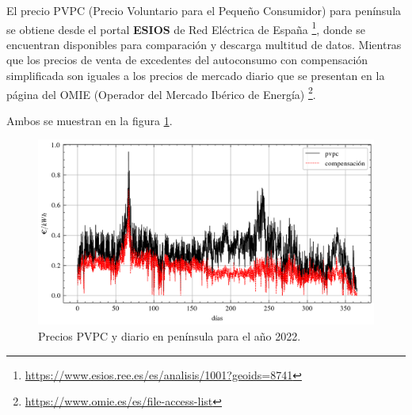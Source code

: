 El precio PVPC (Precio Voluntario para el Pequeño Consumidor) para península se
obtiene desde el portal \textbf{ESIOS} de Red Eléctrica de España
\footnote{\url{https://www.esios.ree.es/es/analisis/1001?geoids=8741}}, donde
se encuentran disponibles para comparación y descarga multitud de datos.
Mientras que los precios de venta de excedentes del autoconsumo con
compensación simplificada son iguales a los precios de mercado diario que se
presentan en la página del OMIE (Operador del Mercado Ibérico de Energía)
\footnote{\url{https://www.omie.es/es/file-access-list}}.

Ambos se muestran en la figura \ref{fig:prices_year}.

\begin{figure}[h] \centering
	\centering
	\includegraphics[width=1\textwidth]{./capitulos/adquisicion_de_datos/images/prices_year.png}
	\caption{Precios PVPC y diario en península para el año 2022.}
	\label{fig:prices_year}
\end{figure}
